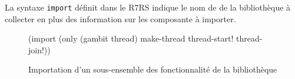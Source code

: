 La syntaxe \lstinline{import} définit dans le R7RS indique le nom de
de la bibliothèque à collecter en plus des information sur les composante
à importer.
\begin{figure}[ht]
  \begin{mplisting}{0.9}
(import (only (gambit thread) make-thread thread-start! thread-join!))
\end{mplisting}
  \caption{Importation d'un sous-ensemble des fonctionnalité de la bibliothèque}
\end{figure}











